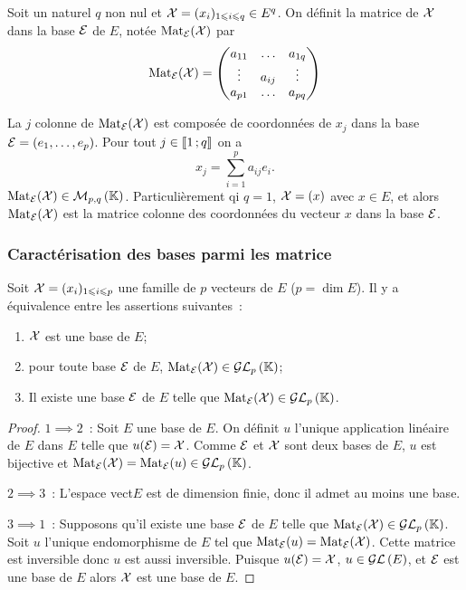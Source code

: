 \begin{defdef}
  Soit un naturel $q$ non nul et $\mathcal{X}=(x_i)_{1 \leqslant i \leqslant q} \in E^q$. On définit la matrice de $\mathcal{X}$ dans la base $\mathcal{E}$ de $E$, notée $\mathrm{Mat}_{\mathcal{E}}(\mathcal{X})$ par
  \begin{equation}
    \mathrm{Mat}_{\mathcal{E}}(\mathcal{X}) =
    \begin{pmatrix}
      a_{11} & \ldots & a_{1q} \\
      \vdots & a_{ij} & \vdots \\
      a_{p1} & \ldots & a_{pq}
    \end{pmatrix}
  \end{equation}

  La $j$\ieme{} colonne de $\mathrm{Mat}_{\mathcal{E}}(\mathcal{X})$ est composée de coordonnées de $x_j$ dans la base $\mathcal{E}=(e_1, \ldots, e_p)$. Pour tout $j \in \mathopen{\llbracket}1\mathclose{}\mathpunct{};q\mathclose{\rrbracket}$ on a
  \begin{equation}
    x_j = \sum_{i=1}^p a_{ij}e_i.
  \end{equation}
  $\mathrm{Mat}_{\mathcal{E}}(\mathcal{X}) \in \mathcal{M}_{p,q}\left(\mathbb{K}\right)$. Particulièrement qi $q=1$, $\mathcal{X}=(x)$ avec $x \in E$, et alors $\mathrm{Mat}_{\mathcal{E}}(\mathcal{X})$ est la matrice colonne des coordonnées du vecteur $x$ dans la base $\mathcal{E}$.
\end{defdef}

\subsubsection{Caractérisation des bases parmi les matrice}

\begin{theo}
  Soit $\mathcal{X}=(x_i)_{1 \leqslant i\leqslant p}$ une famille de $p$ vecteurs de $E$ ($p=\dim E$). Il y a équivalence entre les assertions suivantes~:
  \begin{enumerate}
  \item $\mathcal{X}$ est une base de $E$;
  \item pour toute base $\mathcal{E}$ de $E$, $\mathrm{Mat}_{\mathcal{E}}(\mathcal{X}) \in \mathcal{GL}_{p}\left(\mathbb{K}\right)$;
  \item Il existe une base $\mathcal{E}$ de $E$ telle que $\mathrm{Mat}_{\mathcal{E}}(\mathcal{X}) \in \mathcal{GL}_{p}\left(\mathbb{K}\right)$.
  \end{enumerate}
\end{theo}
\begin{proof}
  $1 \implies 2$~: Soit $E$ une base de $E$. On définit $u$ l'unique application linéaire de $E$ dans $E$ telle que $u(\mathcal{E})=\mathcal{X}$. Comme $\mathcal{E}$ et $\mathcal{X}$ sont deux bases de $E$, $u$ est bijective et $\mathrm{Mat}_{\mathcal{E}}(\mathcal{X})=\mathrm{Mat}_{\mathcal{E}}(u) \in \mathcal{GL}_{p}\left(\mathbb{K}\right)$.

  $2 \implies 3$~: L'espace vect$E$ est de dimension finie, donc il admet au moins une base.

  $3 \implies 1$~: Supposons qu'il existe une base $\mathcal{E}$ de $E$ telle que $\mathrm{Mat}_{\mathcal{E}}(\mathcal{X}) \in \mathcal{GL}_{p}\left(\mathbb{K}\right)$. Soit $u$ l'unique endomorphisme de $E$ tel que $\mathrm{Mat}_{\mathcal{E}}(u)=\mathrm{Mat}_{\mathcal{E}}(\mathcal{X})$. Cette matrice est inversible donc $u$ est aussi inversible. Puisque $u(\mathcal{E})=\mathcal{X}$, $u \in \mathcal{GL}\left(E\right)$, et $\mathcal{E}$ est une base de $E$ alors $\mathcal{X}$ est une base de $E$.
\end{proof}

